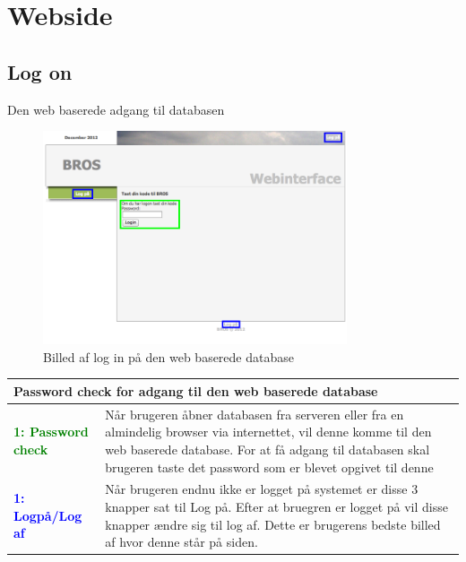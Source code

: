 \section*{Webside}
\subsection*{Log on}
Den web baserede adgang til databasen
\begin{figure}[H]
	\centering
	\includegraphics[width=0.8\textwidth]{billeder/database/web_forside}
	\caption{Billed af log in på den web baserede database}
	\label{fig:web_pass}
\end{figure}

\begin{table}[H]
\begin{tabular}{l p{12.5cm}}
\multicolumn{2}{l}{Password check for adgang til den web baserede database } \\
\hline
\textcolor{green}{\textbf{1: Password check}}
&Når brugeren åbner databasen fra serveren eller fra en almindelig browser via internettet, vil denne komme til den web baserede database. For at få adgang til databasen skal brugeren taste det password som er blevet opgivet til denne\\
\textcolor{blue}{\textbf{1: Logpå/Log af}}
&Når brugeren endnu ikke er logget på systemet er disse 3 knapper sat til Log på. Efter at bruegren er logget på vil disse knapper ændre sig til log af. Dette er brugerens bedste billed af hvor denne står på siden.
\end{tabular}
\end{table}

